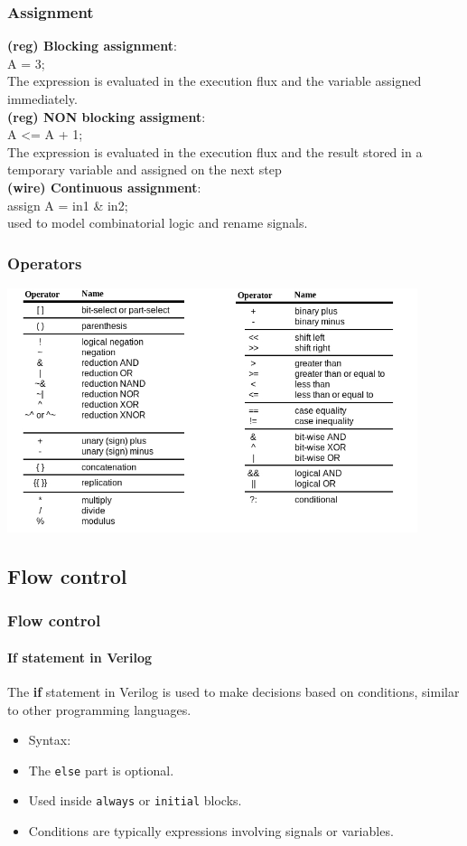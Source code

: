 \documentclass{beamer}
\begin{document}
\begin{frame}\frametitle{Assignment}
	\textbf{(reg) Blocking assignment}: \\
	A = 3; \\
	The expression is evaluated in the execution flux and the variable assigned immediately. \\
	\pause
	\vspace{0.3cm}
	\textbf{(reg) NON blocking assigment}: \\
	A \textless= A + 1; \\
	The expression is evaluated in the execution flux and the result stored in a temporary variable and assigned on the next step \\
	\pause
	\vspace{0.3cm}
	\textbf{(wire) Continuous assignment}: \\
	assign A = in1 \& in2; \\
	used to model combinatorial logic and rename signals.
	
\end{frame}	

\begin{frame}\frametitle{Operators}
\begin{center}
\includegraphics[width=0.9\textwidth]{operatori.jpg}
\end{center}
\end{frame}

\subsection{Flow control}

\begin{frame}\frametitle{Flow control}\framesubtitle{If statement in Verilog}
The \textbf{if} statement in Verilog is used to make decisions based on conditions, similar to other programming languages.

\begin{itemize}
	\item Syntax:
	
	\item The \texttt{else} part is optional.
	\item Used inside \texttt{always} or \texttt{initial} blocks.
	\item Conditions are typically expressions involving signals or variables.
\end{itemize}
\end{frame}
\end{document}
